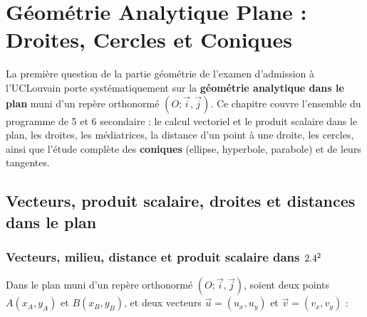 \chapter[Géométrie Analytique Plane et Coniques]{Géométrie Analytique Plane : Droites, Cercles et Coniques}

La première question de la partie géométrie de l'examen d'admission à l'UCLouvain porte systématiquement sur la \textbf{géométrie analytique dans le plan} muni d'un repère orthonormé $(O;\vec{i},\vec{j})$. Ce chapitre couvre l'ensemble du programme de 5\ieme{} et 6\ieme{} secondaire : le calcul vectoriel et le produit scalaire dans le plan, les droites, les médiatrices, la distance d'un point à une droite, les cercles, ainsi que l'étude complète des \textbf{coniques} (ellipse, hyperbole, parabole) et de leurs tangentes.

\section{Vecteurs, produit scalaire, droites et distances dans le plan}

\subsection{Vecteurs, milieu, distance et produit scalaire dans $2.4^2$}

Dans le plan muni d'un repère orthonormé $(O;\vec{i},\vec{j})$, soient deux points $A(x_A, y_A)$ et $B(x_B, y_B)$, et deux vecteurs $\vec{u} = (u_x, u_y)$ et $\vec{v} = (v_x, v_y)$ :

